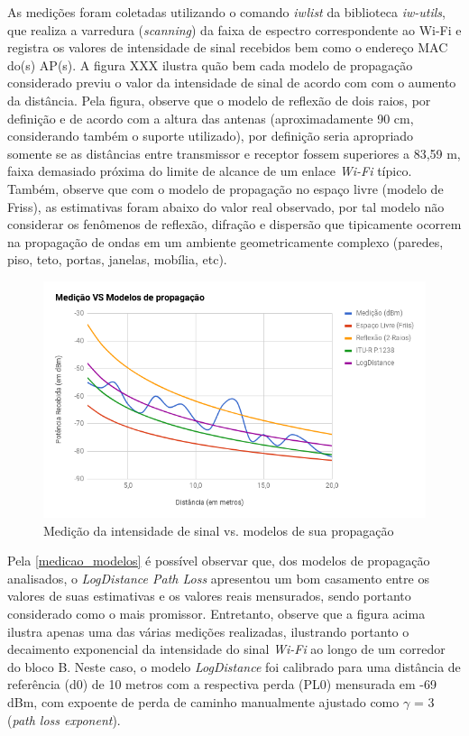 \documentclass[
	12pt,				%
	openright,			%
	twoside,			%
	a4paper,			%
	english,			%
	french,				%
	spanish,			%
	brazil				%
	]{abntex2}
\begin{document}
As medições foram coletadas utilizando o comando \textit{iwlist} da biblioteca \textit{iw-utils}, que realiza a varredura (\textit{scanning}) da faixa de espectro correspondente ao Wi-Fi e registra os valores de intensidade de sinal recebidos bem como o endereço MAC do(s) AP(s). A figura XXX ilustra quão bem cada modelo de propagação considerado previu o valor da intensidade de sinal de acordo com com o aumento da distância. Pela figura, observe que o modelo de reflexão de dois raios, por definição e de acordo com a altura das antenas (aproximadamente 90 cm, considerando também o suporte utilizado), por definição seria apropriado somente se as distâncias entre transmissor e receptor fossem superiores a 83,59 m, faixa demasiado próxima do limite de alcance de um enlace \textit{Wi-Fi} típico. Também, observe que com o modelo de propagação no espaço livre (modelo de Friss), as estimativas foram abaixo do valor real observado, por tal modelo não considerar os fenômenos de reflexão, difração e dispersão que tipicamente ocorrem na propagação de ondas em um ambiente geometricamente complexo (paredes, piso, teto, portas, janelas, mobília, etc). 

\begin{figure}[htb]
	\caption{\label{medicao_modelos} Medição da intensidade de sinal vs. modelos de sua propagação}
	\begin{center}
		\includegraphics[scale=0.6]{images/medicao-modelos.jpg}
	\end{center}
\end{figure}

Pela \autoref{medicao_modelos} é possível observar que, dos modelos de propagação analisados, o \textit{LogDistance Path Loss} apresentou um bom casamento entre os valores de suas estimativas e os valores reais mensurados, sendo portanto considerado como o mais promissor. Entretanto, observe que a figura acima ilustra apenas uma das várias medições realizadas, ilustrando portanto o decaimento exponencial da intensidade do sinal \textit{Wi-Fi} ao longo de um corredor do bloco B. Neste caso, o modelo \textit{LogDistance} foi calibrado para uma distância de referência (d0) de 10 metros com a respectiva perda (PL0) mensurada em -69 dBm, com expoente de perda de caminho manualmente ajustado como $ \gamma $ = 3 (\textit{path loss exponent}).  
\end{document}
